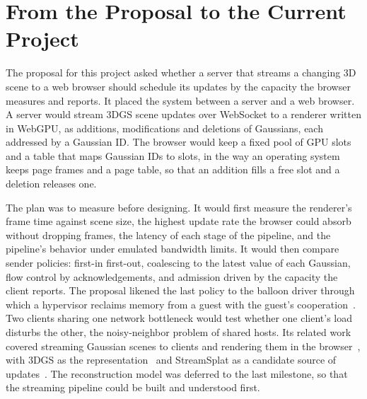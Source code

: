 \section{From the Proposal to the Current Project}
\label{sec:proposal}

The proposal for this project asked whether a server that streams a changing 3D scene to a web browser should schedule its updates by the capacity the browser measures and reports. %
It placed the system between a server and a web browser.
A server would stream 3DGS scene updates over WebSocket to a renderer written in WebGPU, as additions, modifications and deletions of Gaussians, each addressed by a Gaussian ID.
The browser would keep a fixed pool of GPU slots and a table that maps Gaussian IDs to slots, in the way an operating system keeps page frames and a page table, so that an addition fills a free slot and a deletion releases one.

The plan was to measure before designing.
It would first measure the renderer's frame time against scene size, the highest update rate the browser could absorb without dropping frames, the latency of each stage of the pipeline, and the pipeline's behavior under emulated bandwidth limits.
It would then compare sender policies: first-in first-out, coalescing to the latest value of each Gaussian, flow control by acknowledgements, and admission driven by the capacity the client reports.
The proposal likened the last policy to the balloon driver through which a hypervisor reclaims memory from a guest with the guest's cooperation~\cite{waldspurger2002}.
Two clients sharing one network bottleneck would test whether one client's load disturbs the other, the noisy-neighbor problem of shared hosts.
Its related work covered streaming Gaussian scenes to clients and rendering them in the browser~\cite{siekkinen2026,websplatter2026,moqsplat2026,lts2025,lmg2026,gaussanything2026,partialgs2026}, with 3DGS as the representation~\cite{kerbl2023gaussian} and StreamSplat as a candidate source of updates~\cite{streamsplat2026}.
The reconstruction model was deferred to the last milestone, so that the streaming pipeline could be built and understood first.

